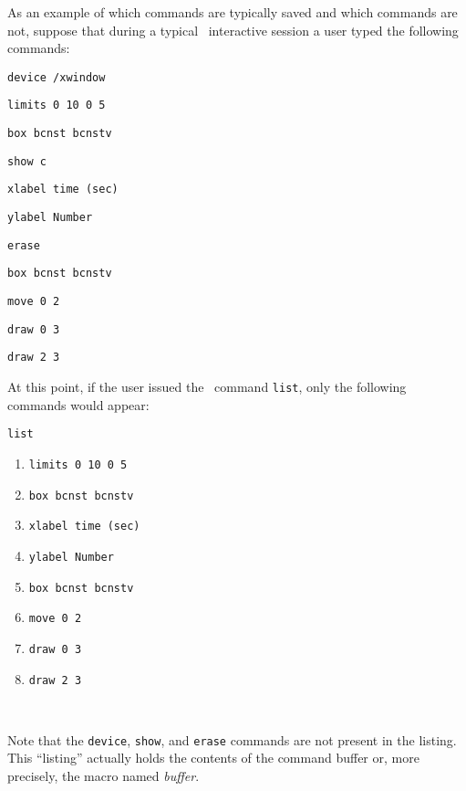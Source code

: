 As an example of which commands are typically saved and which commands are not,
suppose that during a typical \wip\ interactive session a user typed
the following commands:
\begin{wiplist}%
  \item {\tt device /xwindow}
  \item {\tt limits 0 10 0 5}
  \item {\tt box bcnst bcnstv}
  \item {\tt show c}
  \item {\tt xlabel time (sec)}
  \item {\tt ylabel Number}
  \item {\tt erase}
  \item {\tt box bcnst bcnstv}
  \item {\tt move 0 2}
  \item {\tt draw 0 3}
  \item {\tt draw 2 3}
\end{wiplist}
At this point, if the user issued the \wip\ command
{\tt list},%
only the following commands would appear:
\begin{wiplist}%
  \item [\wipp] {\tt list}
\samepage
  \begin{enumerate}\itemsep=0pt
  \item {\tt limits 0 10 0 5}
  \item {\tt box bcnst bcnstv}
  \item {\tt xlabel time (sec)}
  \item {\tt ylabel Number}
  \item {\tt box bcnst bcnstv}
  \item {\tt move 0 2}
  \item {\tt draw 0 3}
  \item {\tt draw 2 3}
  \end{enumerate}
  \item [\wipp] \ %
\end{wiplist}
Note that the {\tt device}, {\tt show}, and {\tt erase} commands are
not present in the listing.
This ``listing'' actually holds the contents of the command buffer or, more
precisely, the macro named {\em buffer}.

